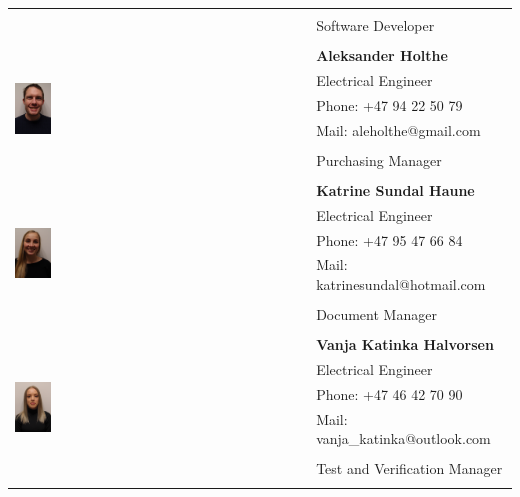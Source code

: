 \begin{center}
\begin{tabular}{|l|l|}
 &   \\
 & Software Developer  \\
 &   \\ \hline
 \multirow{7}{*}{\includegraphics[width = 0.125\textwidth]{VAPIQ-PICTURES/alex}} & \textbf{Aleksander Holthe}  \\
 & Electrical Engineer  \\
 & Phone: +47 94 22 50 79  \\
 & Mail: aleholthe@gmail.com  \\
 &   \\
 & Purchasing Manager  \\
 &   \\ \hline
 \multirow{7}{*}{\includegraphics[width = 0.125\textwidth]{VAPIQ-PICTURES/katrine}} & \textbf{Katrine Sundal Haune}  \\
 & Electrical Engineer  \\
 & Phone: +47 95 47 66 84  \\
 & Mail: katrinesundal@hotmail.com  \\
 &   \\
 & Document Manager  \\
 &   \\ \hline
 \multirow{7}{*}{\includegraphics[width = 0.125\textwidth]{VAPIQ-PICTURES/vanja}} & \textbf{Vanja Katinka Halvorsen}  \\
 & Electrical Engineer  \\
 & Phone: +47 46 42 70 90  \\
 & Mail: vanja{\_}katinka@outlook.com  \\
 &   \\
 & Test and Verification Manager  \\
 &   \\ 
 \hline
    \end{tabular}
    \end{center}
\newpage

